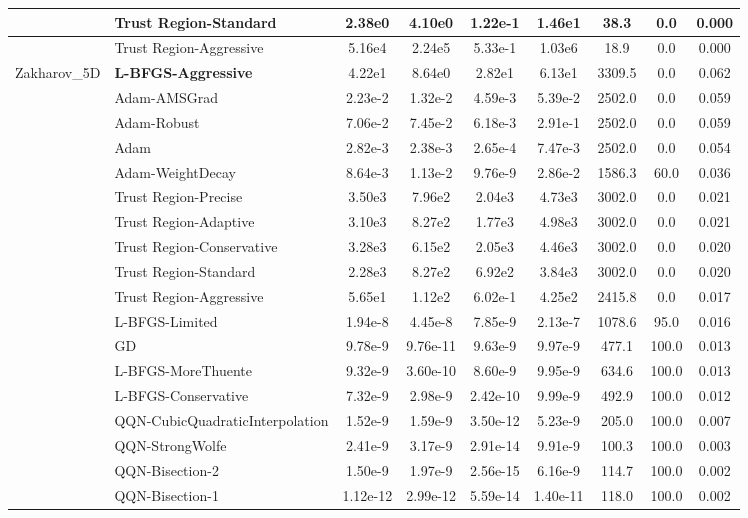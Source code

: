 \documentclass[10pt]{article}
\begin{document}
\begin{longtable}{|l|l|c|c|c|c|c|c|c|}
\hline
 & Trust Region-Standard & 2.38e0 & 4.10e0 & 1.22e-1 & 1.46e1 & 38.3 & 0.0 & 0.000 \\
\hline
 & Trust Region-Aggressive & 5.16e4 & 2.24e5 & 5.33e-1 & 1.03e6 & 18.9 & 0.0 & 0.000 \\
Zakharov\_5D & \textbf{L-BFGS-Aggressive} & 4.22e1 & 8.64e0 & 2.82e1 & 6.13e1 & 3309.5 & 0.0 & 0.062 \\
\hline
 & Adam-AMSGrad & 2.23e-2 & 1.32e-2 & 4.59e-3 & 5.39e-2 & 2502.0 & 0.0 & 0.059 \\
\hline
 & Adam-Robust & 7.06e-2 & 7.45e-2 & 6.18e-3 & 2.91e-1 & 2502.0 & 0.0 & 0.059 \\
\hline
 & Adam & 2.82e-3 & 2.38e-3 & 2.65e-4 & 7.47e-3 & 2502.0 & 0.0 & 0.054 \\
\hline
 & Adam-WeightDecay & 8.64e-3 & 1.13e-2 & 9.76e-9 & 2.86e-2 & 1586.3 & 60.0 & 0.036 \\
\hline
 & Trust Region-Precise & 3.50e3 & 7.96e2 & 2.04e3 & 4.73e3 & 3002.0 & 0.0 & 0.021 \\
\hline
 & Trust Region-Adaptive & 3.10e3 & 8.27e2 & 1.77e3 & 4.98e3 & 3002.0 & 0.0 & 0.021 \\
\hline
 & Trust Region-Conservative & 3.28e3 & 6.15e2 & 2.05e3 & 4.46e3 & 3002.0 & 0.0 & 0.020 \\
\hline
 & Trust Region-Standard & 2.28e3 & 8.27e2 & 6.92e2 & 3.84e3 & 3002.0 & 0.0 & 0.020 \\
\hline
 & Trust Region-Aggressive & 5.65e1 & 1.12e2 & 6.02e-1 & 4.25e2 & 2415.8 & 0.0 & 0.017 \\
\hline
 & L-BFGS-Limited & 1.94e-8 & 4.45e-8 & 7.85e-9 & 2.13e-7 & 1078.6 & 95.0 & 0.016 \\
\hline
 & GD & 9.78e-9 & 9.76e-11 & 9.63e-9 & 9.97e-9 & 477.1 & 100.0 & 0.013 \\
\hline
 & L-BFGS-MoreThuente & 9.32e-9 & 3.60e-10 & 8.60e-9 & 9.95e-9 & 634.6 & 100.0 & 0.013 \\
\hline
 & L-BFGS-Conservative & 7.32e-9 & 2.98e-9 & 2.42e-10 & 9.99e-9 & 492.9 & 100.0 & 0.012 \\
\hline
 & QQN-CubicQuadraticInterpolation & 1.52e-9 & 1.59e-9 & 3.50e-12 & 5.23e-9 & 205.0 & 100.0 & 0.007 \\
\hline
 & QQN-StrongWolfe & 2.41e-9 & 3.17e-9 & 2.91e-14 & 9.91e-9 & 100.3 & 100.0 & 0.003 \\
\hline
 & QQN-Bisection-2 & 1.50e-9 & 1.97e-9 & 2.56e-15 & 6.16e-9 & 114.7 & 100.0 & 0.002 \\
\hline
 & QQN-Bisection-1 & 1.12e-12 & 2.99e-12 & 5.59e-14 & 1.40e-11 & 118.0 & 100.0 & 0.002 \\

\end{longtable}
\end{document}
